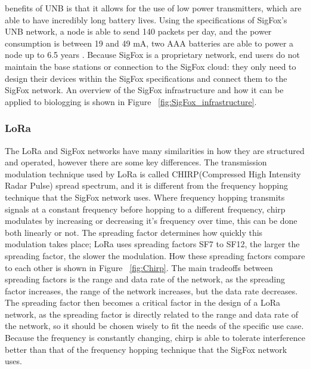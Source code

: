 \documentclass[sigplan,screen,nonacm]{acmart}
\begin{document}
benefits of UNB is that it allows for the use of low power transmitters, which are able 
to have incredibly long battery lives. Using the specifications of SigFox's UNB 
network, a node is able to send 140 packets per day, and the power consumption is 
between 19 and 49 mA, two AAA batteries are able to power a node up to 6.5 years
\cite{LavricSigfoxCommunication}. Because SigFox is a proprietary network, end users 
do not maintain the base stations or connection to the SigFox cloud: they only need to 
design their devices within the SigFox specifications and connect them to the SigFox network. 
An overview of the SigFox infrastructure and how it can be applied to biologging 
is shown in Figure ~\ref{fig:SigFox_infrastructure}.

\subsubsection{LoRa}
\label{subsec:LoRa}

The LoRa and SigFox networks have many similarities in how they are structured 
and operated, however there are some key differences. The transmission modulation 
technique used by LoRa is called CHIRP(Compressed High Intensity Radar Pulse) spread 
spectrum, and it is different from the frequency hopping technique that the SigFox 
network uses. Where frequency hopping transmits signals at a constant frequency before 
hopping to a different frequency, chirp modulates by increasing or decreasing it's 
frequency over time, this can be done both linearly or not\cite{ghoslya2017lora}. The 
spreading factor determines how quickly this modulation takes place; LoRa uses spreading 
factors SF7 to SF12, the larger the spreading factor, the slower the modulation.
How these spreading factors compare to each other is shown in Figure ~\ref{fig:Chirp}. 
The main tradeoffs between spreading factors is the range and data rate of the network, as the 
spreading factor increases, the range of the network increases, but the data rate decreases\cite{erturk2019survey}. 
The spreading factor then becomes a critical factor in the design of a LoRa network, as 
the spreading factor is directly related to the range and data rate of the network, so it should 
be chosen wisely to fit the needs of the specific use case. Because the frequency is constantly 
changing, chirp is able to tolerate interference better than that of the frequency hopping 
technique that the SigFox network uses.
\end{document}
